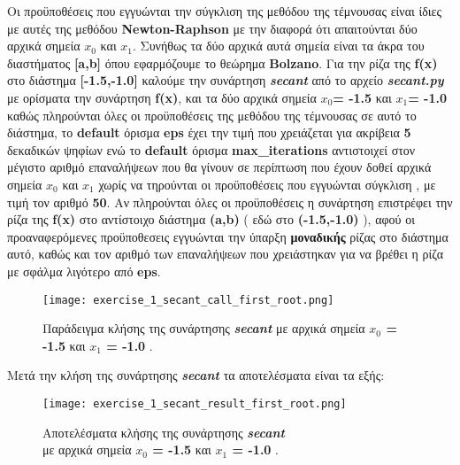 \documentclass[First Project.tex]{subfiles}
\begin{document}
Οι προϋποθέσεις που εγγυώνται την σύγκλιση της μεθόδου της τέμνουσας είναι ίδιες με αυτές της μεθόδου \textlatin{\textbf{Newton-Raphson}} 
με την διαφορά ότι απαιτούνται δύο αρχικά σημεία \textbf{\textlatin{$x_{0}$}} και \textbf{\textlatin{$x_{1}$}}. Συνήθως τα δύο αρχικά αυτά
σημεία είναι τα άκρα του διαστήματος \textlatin{\textbf{[a,b]}} όπου εφαρμόζουμε το θεώρημα \textlatin{\textbf{Bolzano}}. Για την ρίζα της 
\textlatin{\textbf{f(x)}} στο διάστημα \textlatin{\textbf{[-1.5,-1.0]}} καλούμε την συνάρτηση \textit{\textlatin{\textbf{secant}}} 
από το αρχείο \textit{\textlatin{\textbf{secant.py}}} με ορίσματα την συνάρτηση \textlatin{\textbf{f(x)}}, και τα δύο αρχικά σημεία 
\textlatin{\textbf{$x_{0}$= -1.5}} και \textlatin{\textbf{$x_{1}$= -1.0}} καθώς πληρούνται όλες οι προϋποθέσεις της μεθόδου της τέμνουσας
σε αυτό το διάστημα, το \textlatin{\textbf{default}} όρισμα \textlatin{\textbf{eps}} έχει την τιμή που χρειάζεται για ακρίβεια \textbf{5} 
δεκαδικών ψηφίων ενώ το \textlatin{\textbf{default}} όρισμα \textlatin{\textbf{max\_iterations}} αντιστοιχεί στον μέγιστο αριθμό επαναλήψεων 
που θα γίνουν σε περίπτωση που έχουν δοθεί αρχικά σημεία \textbf{\textlatin{$x_{0}$}} και \textbf{\textlatin{$x_{1}$}} χωρίς να τηρούνται οι 
προϋποθέσεις που εγγυώνται σύγκλιση , με τιμή τον αριθμό \textbf{50}. Αν πληρούνται όλες οι προϋποθέσεις η συνάρτηση επιστρέφει την ρίζα της 
\textlatin{\textbf{f(x)}} στο αντίστοιχο διάστημα \textlatin{\textbf{(a,b)}} ( εδώ στο \textlatin{\textbf{(-1.5,-1.0)}} ), αφού οι 
προαναφερόμενες προϋποθεσεις εγγυώνται την ύπαρξη \textbf{μοναδικής} ρίζας στο διάστημα αυτό, καθώς και τον αριθμό των επαναλήψεων που 
χρειάστηκαν για να βρέθει η ρίζα με σφάλμα λιγότερο από \textlatin{\textbf{eps}}.
\vspace{5px}
\begin{figure}[h!]
    \centering
    \captionsetup{justification=centering}
    \begin{center}
        \texttt{[image: exercise\_1\_secant\_call\_first\_root.png]}    
        \caption{ Παράδειγμα κλήσης της συνάρτησης \textit{\textlatin{\textbf{secant}}} με αρχικά σημεία \textbf{\textlatin{$x_{0}$ = -1.5}} 
                    και \textbf{\textlatin{$x_{1}$ = -1.0}} .}
    \end{center}
\end{figure}


Μετά την κλήση της συνάρτησης \textit{\textlatin{\textbf{secant}}} τα αποτελέσματα είναι τα εξής:
\vspace{5px}
\begin{figure}[hp]
    \centering
    \captionsetup{justification=centering}
    \begin{center}
    \texttt{[image: exercise\_1\_secant\_result\_first\_root.png]}    
    \caption{ Αποτελέσματα κλήσης της συνάρτησης \textit{\textlatin{\textbf{secant}}} \\ με αρχικά σημεία \textbf{\textlatin{$x_{0}$ = -1.5}} 
                και \textbf{\textlatin{$x_{1}$ = -1.0}} . }
    \end{center}
\end{figure}
\end{document}
